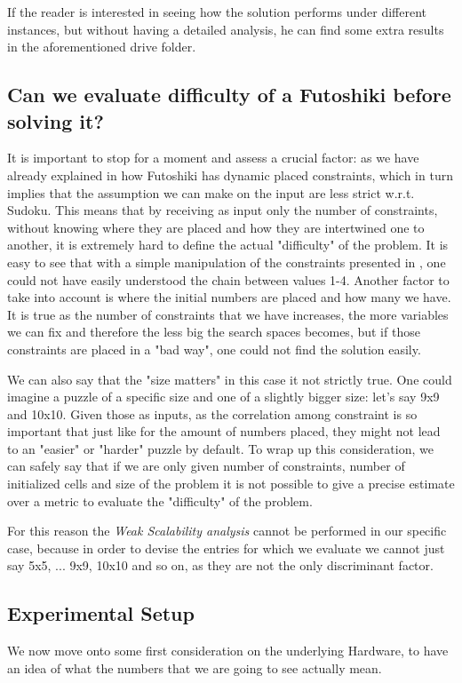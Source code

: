 If the reader is interested in seeing how the solution performs under different instances, but without having a detailed analysis, he can find some extra results in the aforementioned drive folder.


\subsection{Can we evaluate difficulty of a Futoshiki before solving it?}
\label{subsec:futoshiki_difficulty}
It is important to stop for a moment and assess a crucial factor: as we have already explained in  how Futoshiki has dynamic placed constraints, which in turn implies that the assumption we can make on the input are less strict w.r.t. Sudoku. This means that by receiving as input only the number of constraints, without knowing where they are placed and how they are intertwined one to another, it is extremely hard to define the actual "difficulty" of the problem. It is easy to see that with a simple manipulation of the constraints presented in , one could not have easily understood the chain between values 1-4. Another factor to take into account is where the initial numbers are placed and how many we have. It is true as the number of constraints that we have increases, the more variables we can fix and therefore the less big the search spaces becomes, but if those constraints are placed in a "bad way", one could not find the solution easily.

We can also say that the "size matters" in this case it not strictly true. One could imagine a puzzle of a specific size and one of a slightly bigger size: let's say 9x9 and 10x10. Given those as inputs, as the correlation among constraint is so important that just like for the amount of numbers placed, they might not lead to an "easier" or "harder" puzzle by default.
To wrap up this consideration, we can safely say that if we are only given number of constraints, number of initialized cells and size of the problem it is not possible to give a precise estimate over a metric to evaluate the "difficulty" of the problem.

For this reason the \textit{Weak Scalability analysis} cannot be performed in our specific case, because in order to devise the entries for which we evaluate we cannot just say 5x5, ... 9x9, 10x10 and so on, as they are not the only discriminant factor.

\subsection{Experimental Setup}
\label{subsec:experimental_setup}
We now move onto some first consideration on the underlying Hardware, to have an idea of what the numbers that we are going to see actually mean.

